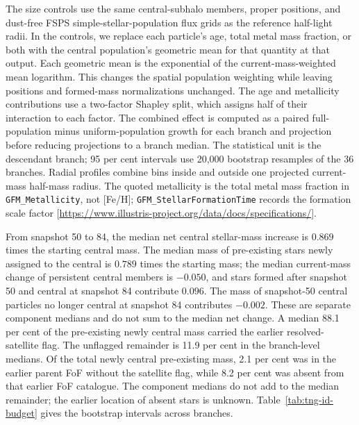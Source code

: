 \documentclass[usenatbib]{mnras}
\begin{document}
The size controls use the same central-subhalo members, proper positions,
and dust-free FSPS simple-stellar-population flux grids as the reference
half-light radii. In the controls, we replace each particle's age, total
metal mass fraction, or both with the central population's geometric mean
for that quantity at that output. Each geometric mean is the exponential
of the current-mass-weighted mean logarithm. This changes the spatial population
weighting while leaving positions and formed-mass normalizations unchanged.
The age and metallicity contributions use a two-factor Shapley split, which
assigns half of their interaction to each factor. The combined effect is
computed as a paired full-population minus uniform-population growth for
each branch and projection before reducing projections to a branch median.
The statistical unit is the descendant branch; 95 per cent intervals use
20,000 bootstrap resamples of the 36 branches. Radial profiles combine bins
inside and outside one projected current-mass half-mass radius. The quoted
metallicity is the total metal mass fraction in \texttt{GFM\_Metallicity},
not [Fe/H]; \texttt{GFM\_StellarFormationTime} records the formation scale
factor [\url{https://www.illustris-project.org/data/docs/specifications/}].

From snapshot 50 to 84, the median net central stellar-mass increase is
$0.869$ times the starting central mass. The median mass of pre-existing
stars newly assigned to the central is $0.789$ times the starting mass;
the median current-mass change of persistent central members is $-0.050$,
and stars formed after snapshot 50 and central at snapshot 84 contribute
$0.096$. The mass of snapshot-50 central particles no longer central at
snapshot 84 contributes $-0.002$. These are separate component medians and
do not sum to the median net change. A median 88.1 per cent of the pre-existing
newly central mass carried the earlier resolved-satellite flag. The unflagged
remainder is 11.9 per cent in the branch-level medians. Of the total newly
central pre-existing mass, 2.1 per cent was in the earlier parent FoF without
the satellite flag, while 8.2 per cent was absent from that earlier FoF
catalogue. The component medians do not add to the median remainder; the
earlier location of absent stars is unknown.
Table~\ref{tab:tng-id-budget} gives the bootstrap intervals across branches.
\end{document}

